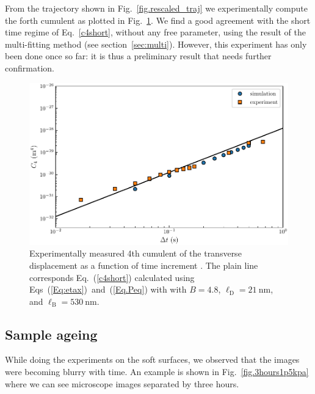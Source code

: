 {From the trajectory shown in Fig.~\ref{fig.rescaled_traj} we experimentally compute the forth cumulent as plotted in Fig.~\ref{fig.forth}. We find a good agreement with the short time regime of Eq.~\ref{c4short}, without any free parameter, using the result of the multi-fitting method (see section~\ref{sec:multi}). However, this experiment has only been done once so far: it is thus a preliminary result that needs further confirmation.
\begin{figure}[H]
	\centering
	\includegraphics{02_body/chapter4/images/4th_cumulent/c4_exp.pdf}
	\caption{Experimentally measured 4th cumulent of the transverse displacement as a function of time increment . The plain line corresponds Eq.~(\ref{c4short}) calculated using  Eqs~(\ref{Eq:etax})~and~(\ref{Eq.Peq}) with with $B = 4.8$, $\ell_\mathrm{D} = 21 ~ \mathrm{nm}$, and $\ell_\mathrm{B} = 530~\mathrm{nm}$. }
	\label{fig.forth}
\end{figure}
\subsection{Sample ageing}

While doing the experiments on the soft surfaces, we observed that the images were becoming blurry with time. An example is shown in Fig.~\ref{fig.3hours1p5kpa} where we can see microscope images separated by three hours.


}
